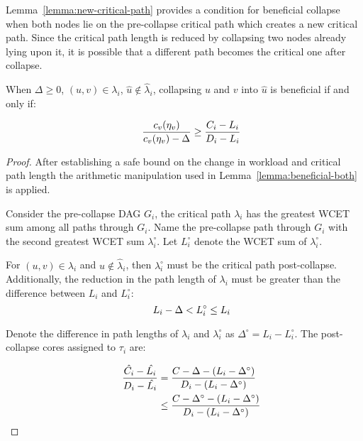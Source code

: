 Lemma~\ref{lemma:new-critical-path} provides a condition for beneficial
collapse when both nodes lie on the pre-collapse critical
path which creates a new critical path. Since the critical path length
is reduced by collapsing two nodes already lying upon it, it is
possible that a different path becomes the critical one after collapse.

\begin{lemma}\label{lemma:new-critical-path}
  When ${\Delta \ge 0}$, ${(u,v) \in \lambda_i}$, ${\hat{u} \not \in
    \hat{\lambda}_i}$, collapsing 
  ${u}$ and ${v}$ into ${\hat{u}}$ is beneficial if and only if:

  \begin{equation}
    \indent
    \frac{c_v(\eta_v)}{c_v(\eta_v) - \Delta} \ge
    \frac{C_i - L_i}{D_i - L_i}
  \end{equation}

  \begin{proof}
    After establishing a safe bound on the change in workload and
    critical path length the arithmetic manipulation used in
    Lemma~\ref{lemma:beneficial-both} is applied.

    Consider the pre-collapse DAG ${G_i}$, the critical path
    ${\lambda_i}$ has the greatest WCET sum among all paths through
    ${G_i}$. Name the pre-collapse path through ${G_i}$ with the
    second greatest WCET sum ${\lambda_i^\circ}$. Let ${L_i^\circ}$ denote the
    WCET sum of ${\lambda_i^\circ}$.

    For ${(u,v) \in \lambda_i}$ and ${\hat{u} \not \in
      \hat{\lambda}_i}$, then ${\lambda_i^\circ}$ must be the critical
    path post-collapse. Additionally, the reduction in the path length
    of ${\lambda_i}$ must be greater than the difference between
    ${L_i}$ and ${L_i^\circ}$:
    \begin{equation*}
      \indent
      L_i - \Delta < L_i^\circ \le L_i
    \end{equation*}

    Denote the difference in path lengths of ${\lambda_i}$ and
    ${\lambda_i^\circ}$ as ${\Delta^\circ = L_i - L_i^\circ}$. The
    post-collapse cores assigned to ${\tau_i}$ are:

    \begin{align*}
      \indent
      \frac{\hat{C_i} - \hat{L_i}} 
           {D_i - \hat{L_i}}
           &=
      \frac{C - \Delta - (L_i - \Delta^\circ)}
           {D_i - (L_i - \Delta^\circ)} \\
           &\le
      \frac{C - \Delta^\circ - (L_i - \Delta^\circ)}
           {D_i - (L_i - \Delta^\circ)}
    \end{align*}


\end{proof}
\end{lemma}
